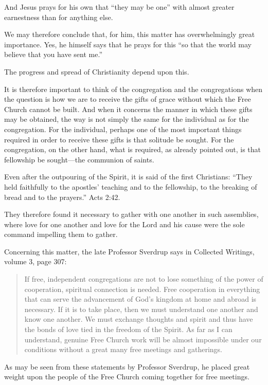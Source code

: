 And Jesus prays for his own that “they may be one” with almost greater earnestness than for anything else.

We may therefore conclude that, for him, this matter has overwhelmingly great importance. Yes, he himself says that he prays for this “so that the world may believe that you have sent me.”

The progress and spread of Christianity depend upon this.

It is therefore important to think of the congregation and the congregations when the question is how we are to receive the gifts of grace without which the Free Church cannot be built. And when it concerns the manner in which these gifts may be obtained, the way is not simply the same for the individual as for the congregation. For the individual, perhaps one of the most important things required in order to receive these gifts is that solitude be sought. For the congregation, on the other hand, what is required, as already pointed out, is that fellowship be sought—the communion of saints.

Even after the outpouring of the Spirit, it is said of the first Christians: “They held faithfully to the apostles’ teaching and to the fellowship, to the breaking of bread and to the prayers.” Acts 2:42.

They therefore found it necessary to gather with one another in such assemblies, where love for one another and love for the Lord and his cause were the sole command impelling them to gather.

Concerning this matter, the late Professor Sverdrup says in Collected Writings, volume 3, page 307:

\begin{quote}
If free, independent congregations are not to lose something of the power of cooperation, spiritual connection is needed. Free cooperation in everything that can serve the advancement of God’s kingdom at home and abroad is necessary. If it is to take place, then we must understand one another and know one another. We must exchange thoughts and spirit and thus have the bonds of love tied in the freedom of the Spirit. As far as I can understand, genuine Free Church work will be almost impossible under our conditions without a great many free meetings and gatherings.
\end{quote}

As may be seen from these statements by Professor Sverdrup, he placed great weight upon the people of the Free Church coming together for free meetings.


